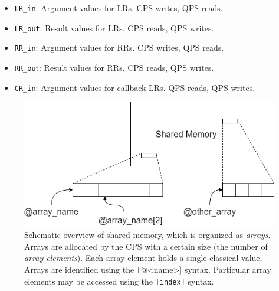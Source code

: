\begin{itemize}
\item \texttt{LR\_in}: Argument values for LRs. CPS writes, QPS reads.
\item \texttt{LR\_out}: Result values for LRs. CPS reads, QPS writes.
\item \texttt{RR\_in}: Argument values for RRs. CPS writes, QPS reads.
\item \texttt{RR\_ou}t: Result values for RRs. CPS reads, QPS writes.
\item \texttt{CR\_in}: Argument values for callback LRs. QPS reads, QPS writes.
\end{itemize}


\begin{figure}[ht]
    \centering
    \includegraphics[width=\columnwidth]{figures/qoala/arrays.png}
    \caption{Schematic overview of shared memory, which is organized as \textit{arrays}.
    Arrays are allocated by the CPS with a certain size (the number of \textit{array elements}).
    Each array element holds a single classical value.
    Arrays are identified using the \texttt[@<name>] syntax.
    Particular array elements may be accessed using the \texttt{[index]} syntax.
    }
    \label{fig:app:arrays}
\end{figure}


